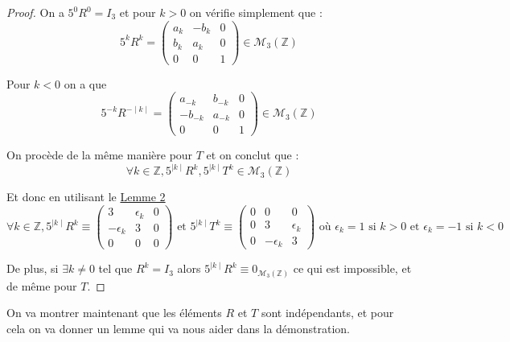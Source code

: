 \begin{proof}
  \hfill

  On a $5^0R^0=I_3$ et pour $k>0$ on vérifie simplement que : $$5^kR^k = \begin{pmatrix}
     a_k & -b_k & 0 \\
   b_k & a_k & 0 \\
   0 & 0 & 1
  \end{pmatrix} \in \mathcal{M}_3(\mathbb{Z})$$\par
  Pour $k<0$ on a que $$5^{-k}R^{- \mid k \mid} = \begin{pmatrix}
     a_{-k} & b_{-k} & 0 \\
   -b_{-k} & a_{-k} & 0 \\
   0 & 0 & 1
  \end{pmatrix} \in \mathcal{M}_3(\mathbb{Z})$$\par
  On procède de la même manière pour $T$ et on conclut que : $$\forall k \in \mathbb{Z}, 5^{\mid k \mid}R^k, 5^{\mid k \mid}T^k \in \mathcal{M}_3(\mathbb{Z})$$\par Et donc en utilisant le  \hyperref[lemme3]{Lemme 2}
  \[
  \forall k \in \mathbb{Z},
  5^{\mid k \mid}R^{k} \equiv \begin{pmatrix}
     3 & \epsilon_k & 0 \\
   -\epsilon_k & 3 & 0 \\
   0 & 0 & 0
  \end{pmatrix}
  \text{ et }
  5^{\mid k \mid}T^{k} \equiv \begin{pmatrix}
     0 & 0 & 0 \\
    0 & 3 & \epsilon_k \\
   0 & -\epsilon_k & 3
  \end{pmatrix}
  \text{ où $\epsilon_k = 1$ si $k>0$ et $\epsilon_k = -1$ si $k<0$}
  \]\par
  De plus, si $\exists k \ne 0 $ tel que $R^k=I_3$ alors $5^{\mid k \mid}R^{k} \equiv 0_{\mathcal{M}_3(\mathbb{Z})}$ ce qui est impossible, et de même pour $T$.
\end{proof}
%
\noindent
On va montrer maintenant que les éléments $R$ et $T$ sont indépendants, et pour cela on va donner un lemme qui va nous aider dans la démonstration.
